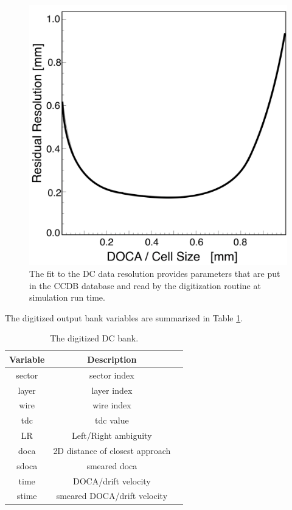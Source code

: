 \begin{figure}
	\centering
	\includegraphics[width=0.99\columnwidth,keepaspectratio]{img/dcResolution.png}
	\caption{The fit to the DC data resolution provides parameters that are put in the CCDB database and read by
    the digitization routine at simulation run time.}
	\label{fig:dcResolution}
\end{figure}

The digitized output bank variables are summarized in Table \ref{tab:dcBank}.

\begin{table}[h]
	\begin{center}
		\begin{tabular}{| c | c | c |}
			\hline \hline
			Variable   & Description \\
			\hline
               sector  &                    sector index   \\
                layer  &                     layer index   \\
                 wire  &                      wire index   \\
                  tdc  &                       tdc value   \\
                   LR  &            Left/Right ambiguity   \\
                 doca  & 2D distance of closest approach   \\
                sdoca  &                    smeared doca   \\
                 time  &           DOCA/drift velocity    \\
                stime  &   smeared DOCA/drift velocity    \\
			\hline \hline
		\end{tabular}
	\end{center}
	\caption{The digitized DC bank.}\label{tab:dcBank}
\end{table}


